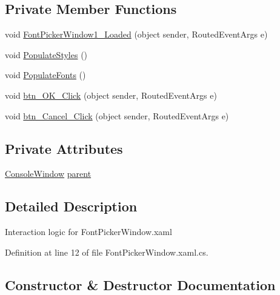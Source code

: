 \subsection*{Private Member Functions}
\begin{DoxyCompactItemize}
\item 
void \hyperlink{class_c_p_u___o_s___simulator_1_1_font_picker_window_a0907f73fb52351e43b76af4137509f41}{Font\+Picker\+Window1\+\_\+\+Loaded} (object sender, Routed\+Event\+Args e)
\item 
void \hyperlink{class_c_p_u___o_s___simulator_1_1_font_picker_window_a79525d7a77c191f63187e5a8181bd197}{Populate\+Styles} ()
\item 
void \hyperlink{class_c_p_u___o_s___simulator_1_1_font_picker_window_a4042c1d9dedbbd9abb956fc7b97c1564}{Populate\+Fonts} ()
\item 
void \hyperlink{class_c_p_u___o_s___simulator_1_1_font_picker_window_a6d659d671c24e1beed969f2d36d669d8}{btn\+\_\+\+O\+K\+\_\+\+Click} (object sender, Routed\+Event\+Args e)
\item 
void \hyperlink{class_c_p_u___o_s___simulator_1_1_font_picker_window_a6e5279d2116523168362cb740eac5e55}{btn\+\_\+\+Cancel\+\_\+\+Click} (object sender, Routed\+Event\+Args e)
\end{DoxyCompactItemize}
\subsection*{Private Attributes}
\begin{DoxyCompactItemize}
\item 
\hyperlink{class_c_p_u___o_s___simulator_1_1_console_window}{Console\+Window} \hyperlink{class_c_p_u___o_s___simulator_1_1_font_picker_window_a4e59cc593e060f3229adc8decfeb151c}{parent}
\end{DoxyCompactItemize}


\subsection{Detailed Description}
Interaction logic for Font\+Picker\+Window.\+xaml 



Definition at line 12 of file Font\+Picker\+Window.\+xaml.\+cs.



\subsection{Constructor \& Destructor Documentation}
\hypertarget{class_c_p_u___o_s___simulator_1_1_font_picker_window_ac395cdfa521446c47bfded624bbfdba6}{}
